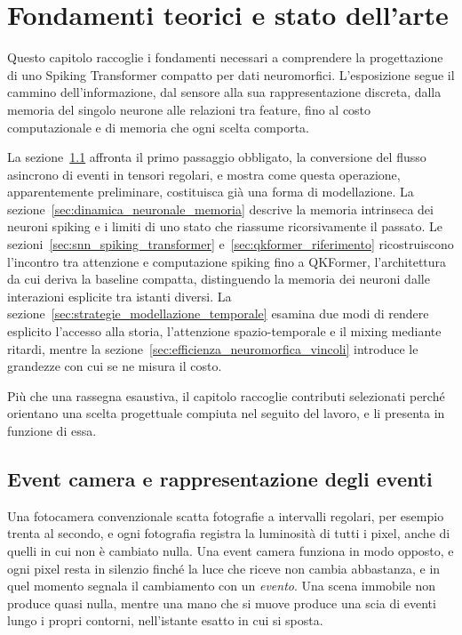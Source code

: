 \chapter{Fondamenti teorici e stato dell'arte}
\label{chap:fondamenti_stato_arte}

Questo capitolo raccoglie i fondamenti necessari a comprendere la progettazione di uno Spiking Transformer compatto per dati neuromorfici. L'esposizione segue il cammino dell'informazione, dal sensore alla sua rappresentazione discreta, dalla memoria del singolo neurone alle relazioni tra feature, fino al costo computazionale e di memoria che ogni scelta comporta.

La sezione~\ref{sec:rappresentazione_event_camera} affronta il primo passaggio obbligato, la conversione del flusso asincrono di eventi in tensori regolari, e mostra come questa operazione, apparentemente preliminare, costituisca già una forma di modellazione. La sezione~\ref{sec:dinamica_neuronale_memoria} descrive la memoria intrinseca dei neuroni spiking e i limiti di uno stato che riassume ricorsivamente il passato. Le sezioni~\ref{sec:snn_spiking_transformer} e~\ref{sec:qkformer_riferimento} ricostruiscono l'incontro tra attenzione e computazione spiking fino a QKFormer, l'architettura da cui deriva la baseline compatta, distinguendo la memoria dei neuroni dalle interazioni esplicite tra istanti diversi. La sezione~\ref{sec:strategie_modellazione_temporale} esamina due modi di rendere esplicito l'accesso alla storia, l'attenzione spazio-temporale e il mixing mediante ritardi, mentre la sezione~\ref{sec:efficienza_neuromorfica_vincoli} introduce le grandezze con cui se ne misura il costo.

Più che una rassegna esaustiva, il capitolo raccoglie contributi selezionati perché orientano una scelta progettuale compiuta nel seguito del lavoro, e li presenta in funzione di essa.



\section{Event camera e rappresentazione degli eventi}
\label{sec:rappresentazione_event_camera}

Una fotocamera convenzionale scatta fotografie a intervalli regolari, per esempio trenta al secondo, e ogni fotografia registra la luminosità di tutti i pixel, anche di quelli in cui non è cambiato nulla. Una event camera funziona in modo opposto, e ogni pixel resta in silenzio finché la luce che riceve non cambia abbastanza, e in quel momento segnala il cambiamento con un \emph{evento}. Una scena immobile non produce quasi nulla, mentre una mano che si muove produce una scia di eventi lungo i propri contorni, nell'istante esatto in cui si sposta.

